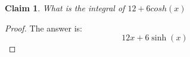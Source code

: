 \documentclass{article}
\newtheorem{theorem}{Claim}
\begin{document}
\begin{theorem}
What is the integral of $ 12 + 6cosh(x) $
\end{theorem}

\begin{proof}
The answer is:
\[
12 x + 6 \sinh{\left(x \right)}
\]
\end{proof}
\end{document}
